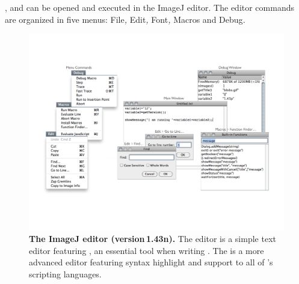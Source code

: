 ,  and 
can be opened and executed in the ImageJ editor. The editor
commands are organized in five menus:\textsf{\emph{ }}\textsf{File}\emph{\lyxarrow{}\negthinspace{},}\textsf{
Edit}\emph{\lyxarrow{}\negthinspace{},}\textsf{ Font}\emph{\lyxarrow{}\negthinspace{},}\textsf{
Macros}\emph{\lyxarrow{}} and\textsf{ Debug}\emph{\lyxarrow{}.}
\begin{figure}[h]
\noindent \includegraphics[scale=0.55]{images/MacroEnvironment}\caption{\textbf{The ImageJ editor (version\,1.43n).} The editor is a simple
text editor featuring , an essential tool
when writing . The 
is a more advanced editor featuring syntax highlight and\textbf{ }support
to all of 's scripting languages.}
\end{figure}


